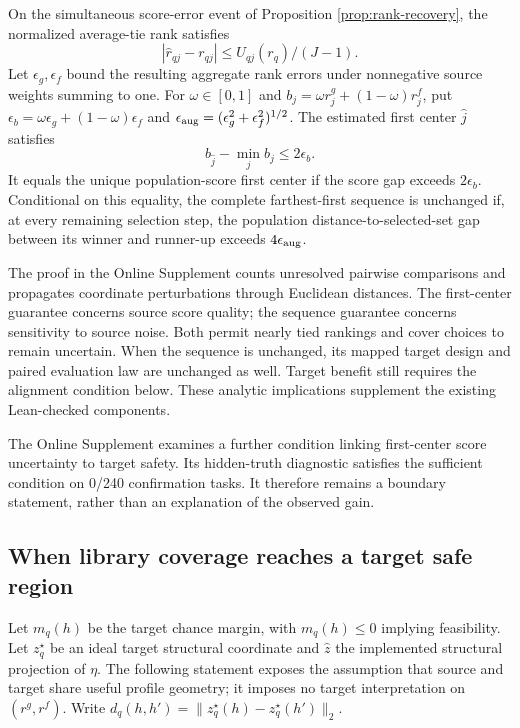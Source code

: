 \begin{proposition}\label{prop:design-stability}
On the simultaneous score-error event of Proposition
\ref{prop:rank-recovery}, the normalized average-tie rank satisfies
\[
 |\widehat r_{qj}-r_{qj}|\le U_{qj}(r_q)/(J-1).
\]
Let $\epsilon_g,\epsilon_f$ bound the resulting aggregate rank errors under
nonnegative source weights summing to one.  For $\omega\in[0,1]$ and
$b_j=\omega r_j^g+(1-\omega)r_j^f$, put
$\epsilon_b=\omega\epsilon_g+(1-\omega)\epsilon_f$ and
$\epsilon_{\rm aug}=(\epsilon_g^2+\epsilon_f^2)^{1/2}$.
The estimated first center $\widehat j$ satisfies
\[
 b_{\widehat j}-\min_j b_j\le2\epsilon_b.
\]
It equals the unique population-score first center if the score gap exceeds
$2\epsilon_b$.  Conditional on this equality, the complete farthest-first
sequence is unchanged if, at every remaining selection step, the population
distance-to-selected-set gap between its winner and runner-up exceeds
$4\epsilon_{\rm aug}$.
\end{proposition}

The proof in the Online Supplement counts unresolved pairwise comparisons
and propagates coordinate perturbations through Euclidean distances.  The
first-center guarantee concerns source score quality; the sequence guarantee
concerns sensitivity to source noise.  Both permit nearly tied rankings and
cover choices to remain uncertain.  When the sequence is unchanged, its
mapped target design and paired evaluation law are unchanged as well.
Target benefit still requires the alignment condition below.  These analytic
implications supplement the existing Lean-checked components.

The Online Supplement examines a further condition linking first-center
score uncertainty to target safety.  Its hidden-truth diagnostic satisfies
the sufficient condition on 0/240 confirmation tasks.  It therefore remains
a boundary statement, rather than an explanation of the observed gain.

\subsection{When library coverage reaches a target safe region}

Let $m_q(h)$ be the target chance margin, with $m_q(h)\le0$ implying
feasibility.  Let $z_q^\star$ be an ideal target structural coordinate and
$\widehat z$ the implemented structural projection of $\eta$.  The following
statement exposes the assumption that source and target share useful profile
geometry; it imposes no target interpretation on $(r^g,r^f)$.  Write
$d_q(h,h')=\|z_q^\star(h)-z_q^\star(h')\|_2$.

